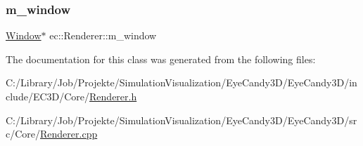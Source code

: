 \mbox{\label{classec_1_1_renderer_ac23d74f9d295bf833f095bdff8c8169b}} 
\subsubsection{\texorpdfstring{m\+\_\+window}{m\_window}}
{\footnotesize\ttfamily \mbox{\hyperlink{classec_1_1_window}{Window}}$\ast$ ec\+::\+Renderer\+::m\+\_\+window\hspace{0.3cm}{\ttfamily [protected]}}



The documentation for this class was generated from the following files\+:\begin{DoxyCompactItemize}
\item 
C\+:/\+Library/\+Job/\+Projekte/\+Simulation\+Visualization/\+Eye\+Candy3\+D/\+Eye\+Candy3\+D/include/\+E\+C3\+D/\+Core/\mbox{\hyperlink{_renderer_8h}{Renderer.\+h}}\item 
C\+:/\+Library/\+Job/\+Projekte/\+Simulation\+Visualization/\+Eye\+Candy3\+D/\+Eye\+Candy3\+D/src/\+Core/\mbox{\hyperlink{_renderer_8cpp}{Renderer.\+cpp}}\end{DoxyCompactItemize}
